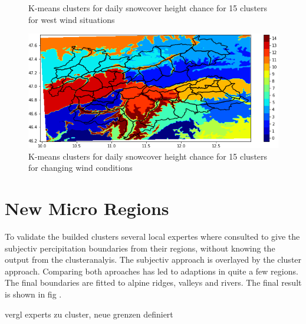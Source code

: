 \begin{figure}[ht]
\begin{minipage}[b]{0.48\linewidth}
      \caption{K-means clusters for daily snowcover height chance for  15 clusters for
      west wind situations} 
      \vspace{4ex}
      \hspace{4ex}
    \end{minipage}%
    \begin{minipage}[b]{0.48\linewidth}
      \centering
      \includegraphics[width=0.9\linewidth]{Figures/figures_snowgrid/15_N_S_W_U/clusters_analysis_undefined_15.png} 
      \caption{K-means clusters for daily snowcover height chance for  15 clusters for changing wind conditions} 
      \vspace{4ex}
      \hspace{4ex}
    \end{minipage} 
  \end{figure}



\section{New Micro Regions}

\noindent To validate the builded clusters several local expertes where consulted to give the subjectiv percipitation
boundaries from their regions, without knowing the output from the clusteranalyis. The subjectiv approach
is overlayed by the cluster approach. Comparing both aproaches has led to adaptions in quite a few regions.
The final boundaries are fitted to alpine ridges, valleys and rivers. The final result is shown in fig . 


vergl experts zu cluster, neue grenzen definiert \\

